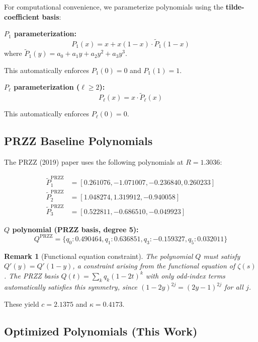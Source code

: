 \documentclass[11pt]{article}
\newtheorem{remark}{Remark}
\begin{document}
For computational convenience, we parameterize polynomials using the \textbf{tilde-coefficient basis}:

\textbf{$P_1$ parameterization:}
\begin{equation}
P_1(x) = x + x(1-x) \cdot \tilde{P}_1(1-x)
\end{equation}
where $\tilde{P}_1(y) = a_0 + a_1 y + a_2 y^2 + a_3 y^3$.

This automatically enforces $P_1(0) = 0$ and $P_1(1) = 1$.

\textbf{$P_\ell$ parameterization ($\ell \geq 2$):}
\begin{equation}
P_\ell(x) = x \cdot \tilde{P}_\ell(x)
\end{equation}

This automatically enforces $P_\ell(0) = 0$.

\subsection{PRZZ Baseline Polynomials}

The PRZZ (2019) paper uses the following polynomials at $R = 1.3036$:

\begin{align}
\tilde{P}_1^{\text{PRZZ}} &= [0.261076, -1.071007, -0.236840, 0.260233] \\
\tilde{P}_2^{\text{PRZZ}} &= [1.048274, 1.319912, -0.940058] \\
\tilde{P}_3^{\text{PRZZ}} &= [0.522811, -0.686510, -0.049923]
\end{align}

\textbf{$Q$ polynomial (PRZZ basis, degree 5):}
\begin{equation}
Q^{\text{PRZZ}} = \{q_0: 0.490464, q_1: 0.636851, q_3: -0.159327, q_5: 0.032011\}
\end{equation}

\begin{remark}[Functional equation constraint]
The polynomial $Q$ must satisfy $Q'(y) = Q'(1-y)$, a constraint arising from
the functional equation of $\zeta(s)$ \cite{Conrey1989,Farmer2025}. The PRZZ basis
$Q(t) = \sum_k q_k (1-2t)^k$ with only odd-index terms automatically satisfies
this symmetry, since $(1-2y)^{2j} = (2y-1)^{2j}$ for all $j$.
\end{remark}

These yield $c = 2.1375$ and $\kappa = 0.4173$.

\subsection{Optimized Polynomials (This Work)}
\end{document}
